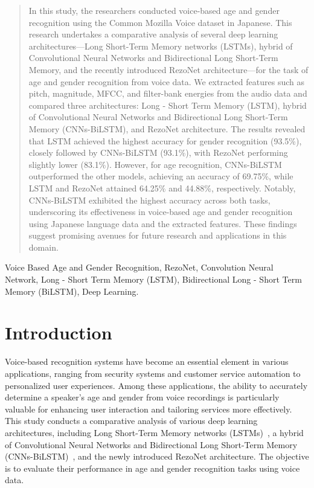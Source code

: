 \documentclass[conference, 10pt,onecolumn]{IEEEtran}
\begin{document}
\begin{abstract}

In this study, the researchers conducted voice-based age and gender recognition using the Common Mozilla Voice dataset in Japanese. This research undertakes a comparative analysis of several deep learning architectures—Long Short-Term Memory networks (LSTMs), hybrid of Convolutional Neural Networks and Bidirectional Long Short-Term Memory, and the recently introduced RezoNet architecture—for the task of age and gender recognition from voice data. We extracted features such as pitch, magnitude, MFCC, and filter-bank energies from the audio data and compared three architectures: Long - Short Term Memory (LSTM), hybrid of Convolutional Neural Networks and Bidirectional Long Short-Term Memory (CNNs-BiLSTM), and RezoNet architecture. The results revealed that LSTM achieved the highest accuracy for gender recognition (93.5\%), closely followed by CNNs-BiLSTM (93.1\%), with RezoNet performing slightly lower (83.1\%). However, for age recognition, CNNs-BiLSTM outperformed the other models, achieving an accuracy of 69.75\%, while LSTM and RezoNet attained 64.25\% and 44.88\%, respectively. Notably, CNNs-BiLSTM exhibited the highest accuracy across both tasks, underscoring its effectiveness in voice-based age and gender recognition using Japanese language data and the extracted features. These findings suggest promising avenues for future research and applications in this domain.
\end{abstract}

\begin{IEEEkeywords}
Voice Based Age and Gender Recognition, RezoNet, Convolution Neural Network, Long - Short Term Memory (LSTM), Bidirectional Long - Short Term Memory (BiLSTM), Deep Learning.
\end{IEEEkeywords}

\section{Introduction}        
Voice-based recognition systems have become an essential element in various applications, ranging from security systems and customer service automation to personalized user experiences. Among these applications, the ability to accurately determine a speaker's age and gender from voice recordings is particularly valuable for enhancing user interaction and tailoring services more effectively. This study conducts a comparative analysis of various deep learning architectures, including Long Short-Term Memory networks (LSTMs)~\cite{yu2019review}, a hybrid of Convolutional Neural Networks and Bidirectional Long Short-Term Memory (CNNs-BiLSTM)~\cite{rhanoui2019cnn}, and the newly introduced RezoNet architecture. The objective is to evaluate their performance in age and gender recognition tasks using voice data.
\end{document}
